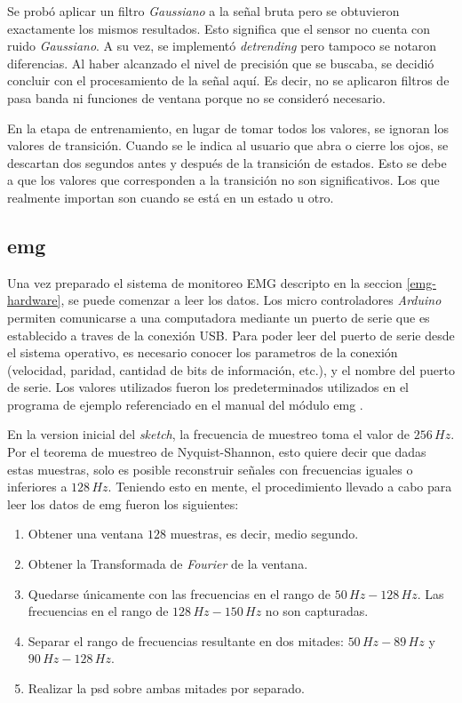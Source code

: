 Se probó aplicar un filtro \emph{Gaussiano} a la señal bruta pero se obtuvieron exactamente los mismos resultados. Esto significa que el sensor no cuenta con ruido \emph{Gaussiano}. A su vez, se implementó \emph{detrending} pero tampoco se notaron diferencias. Al haber alcanzado el nivel de precisión que se buscaba, se decidió concluir con el procesamiento de la señal aquí. Es decir, no se aplicaron filtros de pasa banda ni funciones de ventana porque no se consideró necesario.
 
En la etapa de entrenamiento, en lugar de tomar todos los valores, se ignoran los valores de transición. Cuando se le indica al usuario que abra o cierre los ojos, se descartan dos segundos antes y después de la transición de estados. Esto se debe a que los valores que corresponden a la transición no son significativos. Los que realmente importan son cuando se está en un estado u otro.
 
\subsection{\acrshort{emg}} \label{sec:emg-signal-processing}

Una vez preparado el sistema de monitoreo EMG descripto en la seccion \ref{emg-hardware}, se puede comenzar a leer los datos. Los micro controladores \emph{Arduino} permiten comunicarse a una computadora mediante un puerto de serie que es establecido a traves de la conexión USB.  Para poder leer del puerto de serie desde el sistema operativo, es necesario conocer los parametros de la conexión (velocidad, paridad, cantidad de bits de información, etc.), y el nombre del puerto de serie. Los valores utilizados fueron los predeterminados utilizados en el programa de ejemplo referenciado en el manual del módulo \acrshort{emg} \cite{olimex-manual}.

En la version inicial del \emph{sketch}, la frecuencia de muestreo toma el valor de $256\, Hz$. Por el teorema de muestreo de Nyquist-Shannon, esto quiere decir que dadas estas muestras, solo es posible reconstruir señales con frecuencias iguales o inferiores a $128\, Hz$. Teniendo esto en mente, el procedimiento llevado a cabo para leer los datos de \acrshort{emg} fueron los siguientes:

 \begin{enumerate}
 \item Obtener una ventana $128$ muestras, es decir, medio segundo.
 \item Obtener la Transformada de \emph{Fourier} de la ventana.
 \item Quedarse únicamente con las frecuencias en el rango de $50 \, Hz-128 \, Hz$. Las frecuencias en el rango de $128 \, Hz-150 \, Hz$ no son capturadas.
 \item Separar el rango de frecuencias resultante en dos mitades: $50 \, Hz-89 \, Hz$ y $90 \, Hz-128 \, Hz$.
 \item Realizar la \acrshort{psd} sobre ambas mitades por separado.
 \end{enumerate}

